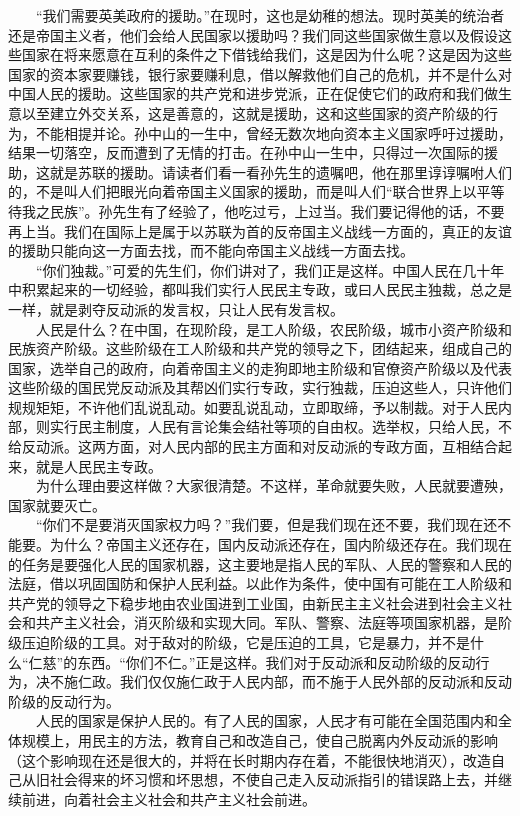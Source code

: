 \documentclass[cn,11pt,chinese]{elegantbook}
\begin{document}
　　“我们需要英美政府的援助。”在现时，这也是幼稚的想法。现时英美的统治者还是帝国主义者，他们会给人民国家以援助吗？我们同这些国家做生意以及假设这些国家在将来愿意在互利的条件之下借钱给我们，这是因为什么呢？这是因为这些国家的资本家要赚钱，银行家要赚利息，借以解救他们自己的危机，并不是什么对中国人民的援助。这些国家的共产党和进步党派，正在促使它们的政府和我们做生意以至建立外交关系，这是善意的，这就是援助，这和这些国家的资产阶级的行为，不能相提并论。孙中山的一生中，曾经无数次地向资本主义国家呼吁过援助，结果一切落空，反而遭到了无情的打击。在孙中山一生中，只得过一次国际的援助，这就是苏联的援助。请读者们看一看孙先生的遗嘱吧，他在那里谆谆嘱咐人们的，不是叫人们把眼光向着帝国主义国家的援助，而是叫人们“联合世界上以平等待我之民族”。孙先生有了经验了，他吃过亏，上过当。我们要记得他的话，不要再上当。我们在国际上是属于以苏联为首的反帝国主义战线一方面的，真正的友谊的援助只能向这一方面去找，而不能向帝国主义战线一方面去找。\\
　　“你们独裁。”可爱的先生们，你们讲对了，我们正是这样。中国人民在几十年中积累起来的一切经验，都叫我们实行人民民主专政，或曰人民民主独裁，总之是一样，就是剥夺反动派的发言权，只让人民有发言权。\\
　　人民是什么？在中国，在现阶段，是工人阶级，农民阶级，城市小资产阶级和民族资产阶级。这些阶级在工人阶级和共产党的领导之下，团结起来，组成自己的国家，选举自己的政府，向着帝国主义的走狗即地主阶级和官僚资产阶级以及代表这些阶级的国民党反动派及其帮凶们实行专政，实行独裁，压迫这些人，只许他们规规矩矩，不许他们乱说乱动。如要乱说乱动，立即取缔，予以制裁。对于人民内部，则实行民主制度，人民有言论集会结社等项的自由权。选举权，只给人民，不给反动派。这两方面，对人民内部的民主方面和对反动派的专政方面，互相结合起来，就是人民民主专政。\\
　　为什么理由要这样做？大家很清楚。不这样，革命就要失败，人民就要遭殃，国家就要灭亡。\\
　　“你们不是要消灭国家权力吗？”我们要，但是我们现在还不要，我们现在还不能要。为什么？帝国主义还存在，国内反动派还存在，国内阶级还存在。我们现在的任务是要强化人民的国家机器，这主要地是指人民的军队、人民的警察和人民的法庭，借以巩固国防和保护人民利益。以此作为条件，使中国有可能在工人阶级和共产党的领导之下稳步地由农业国进到工业国，由新民主主义社会进到社会主义社会和共产主义社会，消灭阶级和实现大同。军队、警察、法庭等项国家机器，是阶级压迫阶级的工具。对于敌对的阶级，它是压迫的工具，它是暴力，并不是什么“仁慈”的东西。“你们不仁。”正是这样。我们对于反动派和反动阶级的反动行为，决不施仁政。我们仅仅施仁政于人民内部，而不施于人民外部的反动派和反动阶级的反动行为。\\
　　人民的国家是保护人民的。有了人民的国家，人民才有可能在全国范围内和全体规模上，用民主的方法，教育自己和改造自己，使自己脱离内外反动派的影响（这个影响现在还是很大的，并将在长时期内存在着，不能很快地消灭），改造自己从旧社会得来的坏习惯和坏思想，不使自己走入反动派指引的错误路上去，并继续前进，向着社会主义社会和共产主义社会前进。\\
\end{document}
